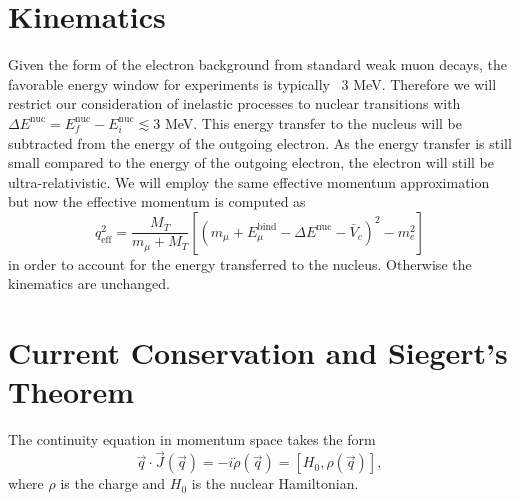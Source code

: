 \documentclass{book}[12pt]
\begin{document}
\section{Kinematics}
Given the form of the electron background from standard weak muon decays, the favorable energy window for experiments is typically ~3 MeV. Therefore we will restrict our consideration of inelastic processes to nuclear transitions with $\Delta E^\mathrm{nuc}=E^\mathrm{nuc}_f-E^\mathrm{nuc}_i \lesssim 3$ MeV. This energy transfer to the nucleus will be subtracted from the energy of the outgoing electron. As the energy transfer is still small compared to the energy of the outgoing electron, the electron will still be ultra-relativistic. We will employ the same effective momentum approximation but now the effective momentum is computed as
\begin{equation}
q^2_\mathrm{eff}=\frac{M_T}{m_{\mu}+M_T}\left[\left(m_{\mu}+E_{\mu}^\mathrm{bind}-\Delta E^\mathrm{nuc}-\bar{V}_c\right)^2-m_e^2\right]
\end{equation}
in order to account for the energy transferred to the nucleus. Otherwise the kinematics are unchanged.
\section{Current Conservation and Siegert's Theorem}
The continuity equation in momentum space takes the form
\begin{equation}
\vec{q}\cdot\vec{J}(\vec{q})=-i\dot{\rho}(\vec{q})=\left[H_0,\rho(\vec{q})\right],
\end{equation}
where $\rho$ is the charge and $H_0$ is the nuclear Hamiltonian.
\end{document}
